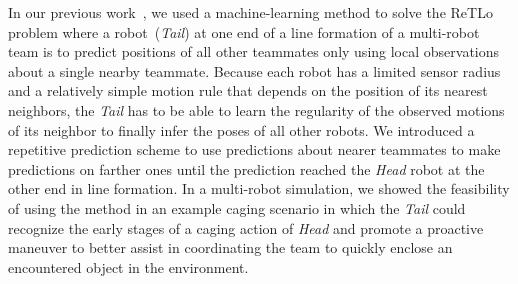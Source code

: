 \documentclass[letterpaper, 10 pt, conference]{ieeeconf}  %
\begin{document}
    In our previous work~\cite{CPR17}, we used a machine-learning method
    to solve the ReTLo problem where a robot~(\emph{Tail}) at one end of a
    line formation of a multi-robot team is to predict positions of all
    other teammates only using local observations about a single nearby
    teammate. Because each robot has a limited sensor radius and a
    relatively simple motion rule that depends on the position of its
    nearest neighbors, the \emph{Tail} has to be able to learn the
    regularity of the observed motions of its neighbor to finally infer
    the poses of all other robots. We introduced a repetitive prediction
    scheme to use predictions about nearer teammates to make predictions
    on farther ones until the prediction reached the \emph{Head} robot
    at the other end in line formation. In a multi-robot simulation, we
    showed the feasibility of using the method in an example caging
    scenario in which the \emph{Tail} could recognize the early stages
    of a caging action of \emph{Head} and promote a proactive maneuver
    to better assist in coordinating the team to quickly enclose an
    encountered object in the environment.
\end{document}

